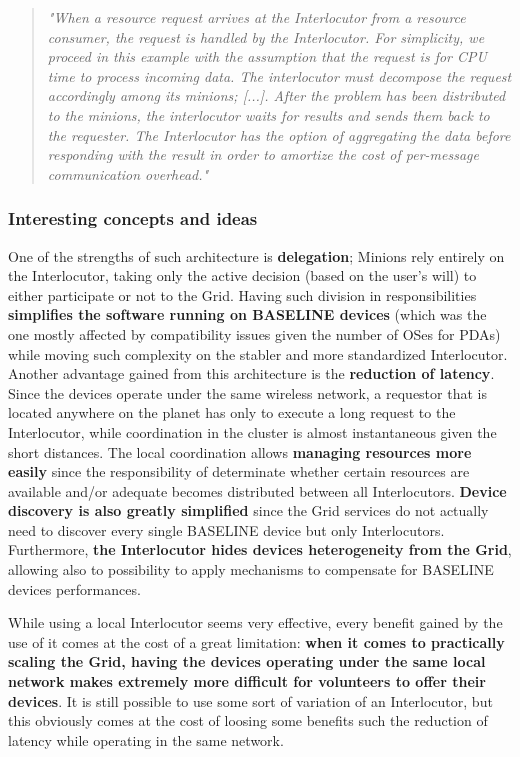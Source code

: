 \begin{quotation}
    \textit{"When a resource request arrives at the Interlocutor from a resource consumer, the request is handled by the Interlocutor. For simplicity, we proceed in this example with the assumption that the request is for CPU time to process incoming data. The interlocutor must decompose the request accordingly among its minions; [...]. After the problem has been distributed to the minions, the interlocutor waits for results and sends them back to the requester. The Interlocutor has the option of aggregating the data before responding with the result in order to amortize the cost of per-message communication overhead." \cite{integrating_mobile_devices_into_grid}}
\end{quotation}

\subsubsection{Interesting concepts and ideas}
One of the strengths of such architecture is \textbf{delegation}; Minions rely entirely on the Interlocutor, taking only the active decision (based on the user's will) to either participate or not to the Grid. Having such division in responsibilities \textbf{simplifies the software running on BASELINE devices} (which was the one mostly affected by compatibility issues given the number of OSes for PDAs) while moving such complexity on the stabler and more standardized Interlocutor.
Another advantage gained from this architecture is the \textbf{reduction of latency}. Since the devices operate under the same wireless network, a requestor that is located anywhere on the planet has only to execute a long request to the Interlocutor, while coordination in the cluster is almost instantaneous given the short distances.
The local coordination allows \textbf{managing resources more easily} since the responsibility of determinate whether certain resources are available and/or adequate becomes distributed between all Interlocutors.
\textbf{Device discovery is also greatly simplified} since the Grid services do not actually need to discover every single BASELINE device but only Interlocutors.
Furthermore, \textbf{the Interlocutor hides devices heterogeneity from the Grid}, allowing also to possibility to apply mechanisms to compensate for BASELINE devices performances.

While using a local Interlocutor seems very effective, every benefit gained by the use of it comes at the cost of a great limitation: \textbf{when it comes to practically scaling the Grid, having the devices operating under the same local network makes extremely more difficult for volunteers to offer their devices}. It is still possible to use some sort of variation of an Interlocutor, but this obviously comes at the cost of loosing some benefits such the reduction of latency while operating in the same network.


